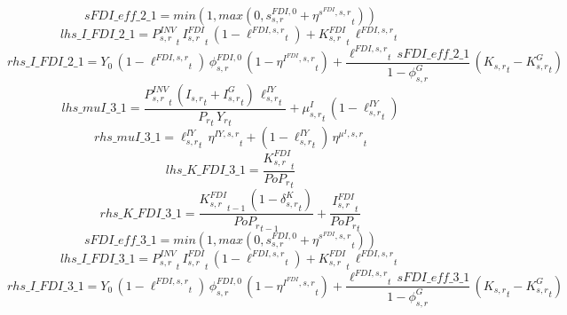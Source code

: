 \begin{dmath*}
sFDI\_eff\_2\_1 = min(1,max(0,{{s^{FDI,0}_{s,r}}}+{{\eta^{s^{FDI},s,r}}}_{t}))
\end{dmath*}
\begin{dmath*}
lhs\_I\_FDI\_2\_1 = {{P^{INV}_{s,r}}}_{t}\, {{I^{FDI}_{s,r}}}_{t}\, \left(1-{{\ell^{FDI,s,r}}}_{t}\right)+{{K^{FDI}_{s,r}}}_{t}\, {{\ell^{FDI,s,r}}}_{t}
\end{dmath*}
\begin{dmath*}
rhs\_I\_FDI\_2\_1 = {{Y_0}}\, \left(1-{{\ell^{FDI,s,r}}}_{t}\right)\, {{\phi^{FDI,0}_{s,r}}}\, \left(1-{{\eta^{I^{FDI},s,r}}}_{t}\right)+\frac{{{\ell^{FDI,s,r}}}_{t}\, {sFDI\_eff\_2\_1}}{1-{{\phi^{G}_{s,r}}}}\, \left({{K_{s,r}}}_{t}-{{K^G_{s,r}}}_{t}\right)
\end{dmath*}
\begin{dmath*}
lhs\_muI\_3\_1 = \frac{{{P^{INV}_{s,r}}}_{t}\, \left({{I_{s,r}}}_{t}+{{I^G_{s,r}}}_{t}\right)\, {{\ell^{IY}_{s,r}}}_{t}}{{{P_{r}}}_{t}\, {{Y_r}}_{t}}+{{\mu^{I}_{s,r}}}_{t}\, \left(1-{{\ell^{IY}_{s,r}}}_{t}\right)
\end{dmath*}
\begin{dmath*}
rhs\_muI\_3\_1 = {{\ell^{IY}_{s,r}}}_{t}\, {{\eta^{IY,s,r}}}_{t}+\left(1-{{\ell^{IY}_{s,r}}}_{t}\right)\, {{\eta^{\mu^{I},s,r}}}_{t}
\end{dmath*}
\begin{dmath*}
lhs\_K\_FDI\_3\_1 = \frac{{{K^{FDI}_{s,r}}}_{t}}{{{PoP_r}}_{t}}
\end{dmath*}
\begin{dmath*}
rhs\_K\_FDI\_3\_1 = \frac{{{K^{FDI}_{s,r}}}_{t-1}\, \left(1-{{\delta^{K}_{s,r}}}_{t}\right)}{{{PoP_r}}_{t-1}}+\frac{{{I^{FDI}_{s,r}}}_{t}}{{{PoP_r}}_{t}}
\end{dmath*}
\begin{dmath*}
sFDI\_eff\_3\_1 = min(1,max(0,{{s^{FDI,0}_{s,r}}}+{{\eta^{s^{FDI},s,r}}}_{t}))
\end{dmath*}
\begin{dmath*}
lhs\_I\_FDI\_3\_1 = {{P^{INV}_{s,r}}}_{t}\, {{I^{FDI}_{s,r}}}_{t}\, \left(1-{{\ell^{FDI,s,r}}}_{t}\right)+{{K^{FDI}_{s,r}}}_{t}\, {{\ell^{FDI,s,r}}}_{t}
\end{dmath*}
\begin{dmath*}
rhs\_I\_FDI\_3\_1 = {{Y_0}}\, \left(1-{{\ell^{FDI,s,r}}}_{t}\right)\, {{\phi^{FDI,0}_{s,r}}}\, \left(1-{{\eta^{I^{FDI},s,r}}}_{t}\right)+\frac{{{\ell^{FDI,s,r}}}_{t}\, {sFDI\_eff\_3\_1}}{1-{{\phi^{G}_{s,r}}}}\, \left({{K_{s,r}}}_{t}-{{K^G_{s,r}}}_{t}\right)
\end{dmath*}
